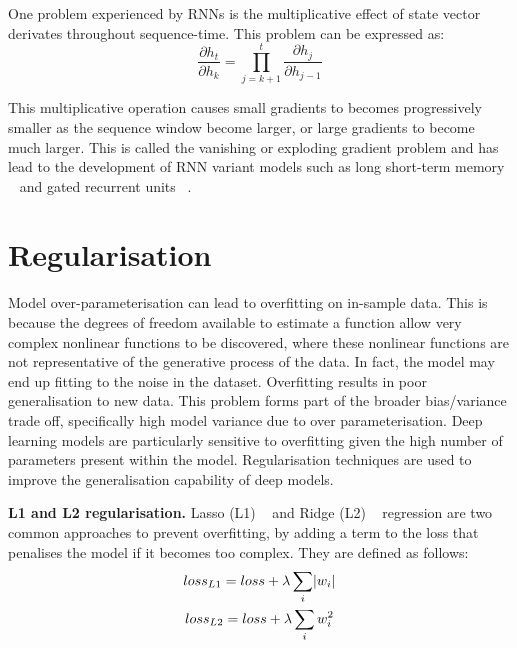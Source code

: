 \noindent One problem experienced by RNNs is the multiplicative effect of state vector derivates throughout sequence-time. This problem can be expressed as:
\begin{equation}
	\frac{\partial h_t} {\partial h_k} = \prod_{j=k+1}^t\frac{\partial h_j} {\partial h_{j-1}}
\end{equation}

\noindent This multiplicative operation causes small gradients to becomes progressively smaller as the sequence window become larger, or large gradients to become much larger. This is called the vanishing or exploding gradient problem and has lead to the development of RNN variant models such as long short-term memory \unskip ~\citep{hochreiter1997long} and gated recurrent units \unskip ~\citep{cho2014learning}.



\section{Regularisation}

Model over-parameterisation can lead to overfitting on in-sample data. This is because the degrees of freedom available to estimate a function allow very complex nonlinear functions to be discovered, where these nonlinear functions are not representative of the generative process of the data. In fact, the model may end up fitting to the noise in the dataset. Overfitting results in poor generalisation to new data. This problem forms part of the broader bias/variance trade off, specifically high model variance due to over parameterisation. Deep learning models are particularly sensitive to overfitting given the high number of parameters present within the model. Regularisation techniques are used to improve the generalisation capability of deep models. \par

\noindent \textbf{L1 and L2 regularisation.} Lasso (L1) \unskip ~\citep{tibshirani1996regression} and Ridge (L2) \unskip ~\citep{hoerl1970ridge} regression are two common approaches to prevent overfitting, by adding a term to the loss that penalises the model if it becomes too complex. They are defined as follows:
\begin{subequations}
	\begin{gather}
		loss_{L1} = loss + \lambda\sum_i\abs{w_i}  \\
		loss_{L2} = loss + \lambda\sum_iw_i^2
	\end{gather}
\end{subequations}

